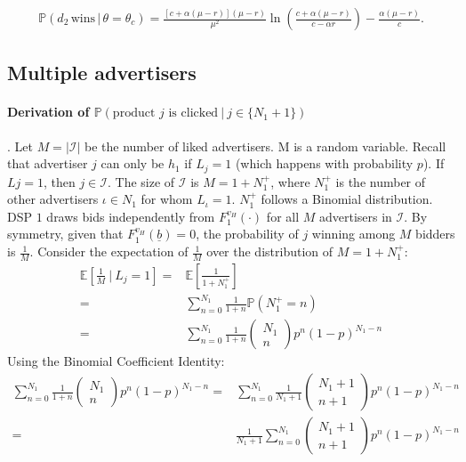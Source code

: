 \begin{align*}
\mathbb{P}(d_2 \, \text{wins} \, | \, \theta = \theta_c) = \frac{[c+\alpha(\mu-r)](\mu-r)}{\mu^2}\ln \left(\frac{c+\alpha(\mu-r)}{c-\alpha r} \right) - \frac{\alpha(\mu-r)}{c}.
\end{align*}

\subsection{Multiple advertisers}
\paragraph{Derivation of $\mathbb{P}(\text{product } j \text{ is clicked} \ | \ j \in \{N_{1}+1\} )$}. Let $M = |\mathcal{I}|$ be the number of liked advertisers. M is a random variable. Recall that advertiser $j$ can only be $h_1$ if $L_j=1$ (which happens with probability $p$). If $Lj=1$, then $j \in \mathcal{I}$. The size of $\mathcal{I}$ is $M = 1 + N_1^+$, where $ N_1^+$ is the number of other advertisers $\iota \in N_1$ for whom $L_{\iota} = 1$. $ N_1^+$ follows a Binomial distribution. DSP $1$ draws bids independently from $F_1^{v_H}(\cdot)$ for all $M$ advertisers in $\mathcal{I}$. By symmetry, given that $F_1^{v_H}(\underline{b})=0$, the probability of $j$ winning among $M$ bidders is $\frac{1}{M}$. Consider the expectation of $\frac{1}{M}$ over the distribution of $M = 1 + N_1^+$:
\begin{align*}
    \mathbb{E}\left[\frac{1}{M} \ \bigg| \ L_j=1\right] = & \mathbb{E}\left[\frac{1}{1+N_1^+}\right] \\[5pt]
    = & \sum_{n=0}^{N_1} \frac{1}{1+n} \mathbb{P}(N_1^+ = n) \\[5pt]
    = & \sum_{n=0}^{N_1} \frac{1}{1+n} \begin{pmatrix}
        N_1 \\
        n
    \end{pmatrix} p^n (1-p)^{N_1-n}
\end{align*}
\noindent Using the Binomial Coefficient Identity:
\begin{align*}
    \sum_{n=0}^{N_1} \frac{1}{1+n} \begin{pmatrix}
        N_1 \\
        n
    \end{pmatrix} p^n (1-p)^{N_1-n} = & \sum_{n=0}^{N_1} \frac{1}{N_1+1} \begin{pmatrix}
        N_1+1 \\
        n+1
    \end{pmatrix} p^n (1-p)^{N_1-n} \\[5pt]
    = & \frac{1}{N_1+1} \sum_{n=0}^{N_1} \begin{pmatrix}
        N_1+1 \\
        n+1
    \end{pmatrix} p^n (1-p)^{N_1-n}
\end{align*}

